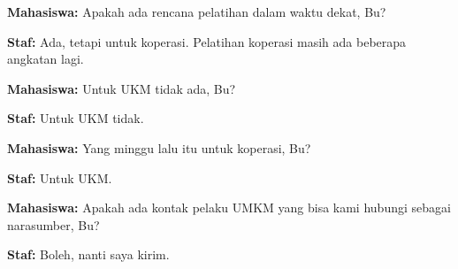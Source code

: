{\noindent \textbf{Mahasiswa:} Apakah ada rencana pelatihan dalam waktu dekat, Bu?

\noindent \textbf{Staf:} Ada, tetapi untuk koperasi. Pelatihan koperasi masih ada beberapa angkatan lagi.

\noindent \textbf{Mahasiswa:} Untuk UKM tidak ada, Bu?

\noindent \textbf{Staf:} Untuk UKM tidak.

\noindent \textbf{Mahasiswa:} Yang minggu lalu itu untuk koperasi, Bu?

\noindent \textbf{Staf:} Untuk UKM.

\noindent \textbf{Mahasiswa:} Apakah ada kontak pelaku UMKM yang bisa kami hubungi sebagai narasumber, Bu?

\noindent \textbf{Staf:} Boleh, nanti saya kirim.
}

\clearpage
{}

